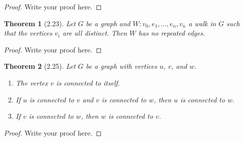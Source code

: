 \documentclass{article}
\newtheorem*{thm}{Theorem}
\begin{document}
\begin{proof}
    Write your proof here.
\end{proof}

\begin{thm}[2.23]
	Let $G$ be a graph and $W: v_0, e_1, ..., e_n, v_n$ a walk in $G$ such that the vertices $v_i$ are all distinct. Then $W$ has no repeated edges. \end{thm}

\begin{proof}
    Write your proof here.
\end{proof}

\begin{thm}[2.25]
	Let $G$ be a graph with vertices $u$, $v$, and $w$. 
	\begin{enumerate}
	  \item The vertex $v$ is connected to itself. 
	  \item If $u$ is connected to $v$ and $v$ is connected to $w$, then $u$ is connected to $w$.
	  \item If $v$ is connected to $w$, then $w$ is connected to $v$.
	\end{enumerate}
\end{thm}

\begin{proof}
    Write your proof here.
\end{proof}
\end{document}

